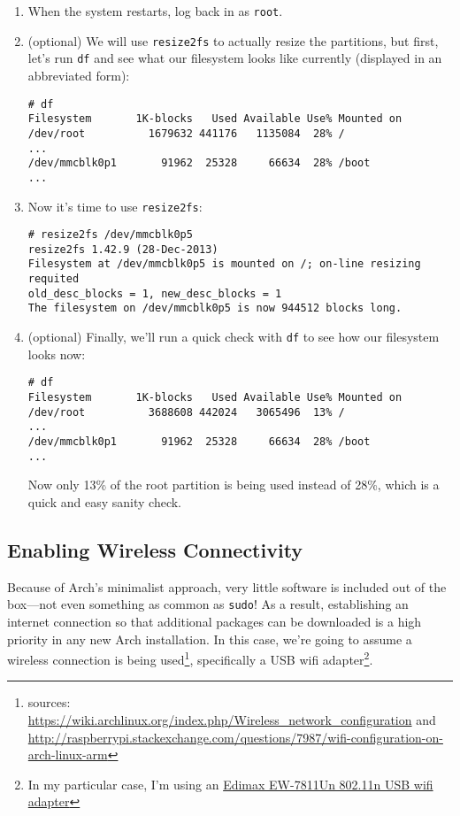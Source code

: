 \documentclass[12pt,letterpaper]{article}
\newcommand\styledhref[2]{\href{#1}{\sf #2}}
\begin{document}
\begin{enumerate}
\item When the system restarts, log back in as \lstinline{root}.

\item (optional) We will use \lstinline{resize2fs} to actually resize the partitions, but first, let's run \lstinline{df} and see what our filesystem looks like currently (displayed in an abbreviated form):
\begin{lstlisting}[basicstyle=\ttfamily\scriptsize]
# df
Filesystem       1K-blocks   Used Available Use% Mounted on
/dev/root          1679632 441176   1135084  28% /
...
/dev/mmcblk0p1       91962  25328     66634  28% /boot
...
\end{lstlisting}

\item Now it's time to use \lstinline{resize2fs}:
\begin{lstlisting}
# resize2fs /dev/mmcblk0p5
resize2fs 1.42.9 (28-Dec-2013)
Filesystem at /dev/mmcblk0p5 is mounted on /; on-line resizing requited
old_desc_blocks = 1, new_desc_blocks = 1
The filesystem on /dev/mmcblk0p5 is now 944512 blocks long.
\end{lstlisting}

\item (optional) Finally, we'll run a quick check with \lstinline{df} to see how our filesystem looks now:
\begin{lstlisting}[basicstyle=\ttfamily\scriptsize]
# df
Filesystem       1K-blocks   Used Available Use% Mounted on
/dev/root          3688608 442024   3065496  13% /
...
/dev/mmcblk0p1       91962  25328     66634  28% /boot
...
\end{lstlisting}
Now only 13\% of the root partition is being used instead of 28\%, which is a quick and easy sanity check.
\end{enumerate}

\subsection{Enabling Wireless Connectivity}
Because of Arch's minimalist approach, very little software is included out of the box---not even something as common as \lstinline{sudo}!  As a result, establishing an internet connection so that additional packages can be downloaded is a high priority in any new Arch installation.  In this case, we're going to assume a wireless connection is being used\footnote{sources: \url{https://wiki.archlinux.org/index.php/Wireless_network_configuration} and \url{http://raspberrypi.stackexchange.com/questions/7987/wifi-configuration-on-arch-linux-arm}}, specifically a USB wifi adapter\footnote{In my particular case, I'm using an \styledhref{http://lmgtfy.com/?q=\%22Edimax+EW-7811Un\%22}{Edimax EW-7811Un 802.11n USB wifi adapter}}.
\end{document}
